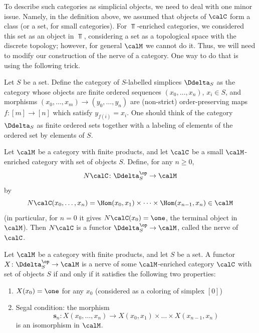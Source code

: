 To describe such categories as simplicial objects, we need to deal with one
minor issue. Namely, in the definition above, we assumed that objects of $\calC$
form a class (or a set, for small categories). For $\Top$-enriched categories,
we considered this set as an object in $\Top$, considering a set as a
topological space with the discrete topology; however, for general $\calM$ we
cannot do it. Thus, we will need to modify our construction of the nerve of a
category. One way to do that is using the following trick.

Let $S$ be a set. Define the category of $S$-labelled simplices $\Ddelta_S$ as
the category whose objects are finite ordered sequences $(x_0, \dots, x_n)$,
$x_i \in S$, and morphisms $(x_0, \dots, x_m)\to (y_0, \dots, y_n)$ are
(non-strict) order-preserving maps $f\colon [m]\to [n]$ which satisfy
$y_{f(i)}=x_i$. One should think of the category $\Ddelta_S$ as finite ordered
sets together with a labeling of elements of the ordered set by elements of $S$.


\begin{definition}\label{d:nerve-enriched}
  Let $\calM$ be a category with finite products, and let $\calC$ be a small
  $\calM$-enriched category with set of objects $S$. Define, for any $n\ge 0$,
  $$
    N\calC\colon \Ddelta_S^\op\to \calM
  $$
  by
  $$
    N\calC(x_0, \dots, x_n)
    =\Hom(x_0, x_1)\times \dots\times \Hom(x_{n-1}, x_n)\in \calM
  $$
  (in particular, for $n=0$ it gives
  $N\calC (x_0)=\one$, the terminal object in $\calM$).
  Then $N\calC$ is a functor $\Ddelta_S^\op\to \calM$, called the nerve of
  $\calC$.
\end{definition}

\begin{theorem}\label{t:nerve-enriched}
  Let $\calM$ be a category with finite products, and let $S$ be a set. A
  functor $X\colon \Ddelta_S^\op\to \calM$ is a nerve of some $\calM$-enriched
  category $\calC$ with set of objects $S$ if and only if it satisfies the
  following two properties:
  \begin{enumerate}
    \item $X(x_0)=\one$ for any $x_0$ \textup{(}considered as a coloring of simplex
      $[0]$\textup{)}
    \item Segal condition: the morphism
    $$
      \mathbf{s}_n\colon X(x_0, \dots, x_n)\to
        X(x_0, x_1)\times \dots\times X(x_{n-1}, x_n)
    $$
    is an isomorphism in $\calM$.
  \end{enumerate}
\end{theorem}

